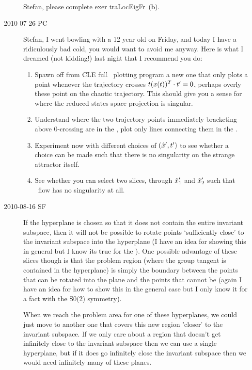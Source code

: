 \begin{description}
Stefan, please complete exer {traLocEigFr}~(b).

\item[2010-07-26 PC]
Stefan, I went bowling with a 12 year old on Friday, and
today I have a ridiculously bad cold, you would want to avoid
me anyway. Here is what I dreamed (not kidding!) last night
that I recommend you do:

\begin{enumerate}
    \item
Spawn off from CLE full \statesp\ plotting program a new
one that only plots a point whenever the trajectory crosses
$t(x(t))^T \cdot t'_{} =0$, perhaps overly these point on the chaotic
trajectory. This should give you a sense for where the
reduced states space projection is singular.
    \item
Understand where the two trajectory points immediately
bracketing above 0-crossing are in the \reducedsp,
plot only lines connecting them in the \reducedsp.
    \item
Experiment now with different choices of $({\hat{x}'},t'_{})$ to see
whether a choice can be made such that there is no
singularity on the strange attractor itself.
    \item
See whether you can select two slices, through ${\hat{x}'}_1$ and ${\hat{x}'}_2$
such that \reducedsp\ flow has no singularity at
all.
\end{enumerate}


\item[2010-08-16 SF]
If the hyperplane is chosen so that it does not contain the
entire invariant subspace, then it will not be possible to
rotate points `sufficiently close' to the invariant subspace
into the hyperplane (I have an idea for showing this in
general but I know its true for the \cLe ). One possible
advantage of these slices though is that the problem region
(where the group tangent is contained in the hyperplane) is
simply the boundary between the points that can be rotated
into the plane and the points that cannot be (again I have an
idea for how to show this in the general case but I only know
it for a fact with the S0(2) symmetry).

When we reach the problem area for one of these hyperplanes,
we could just move to another one that covers this new region
'closer' to the invariant subspace. If we only care about a
region that doesn't get infinitely close to the invariant
subspace then we can use a single hyperplane, but if it does
go infinitely close the invariant subspace then we would need
infinitely many of these planes.


\end{description}

